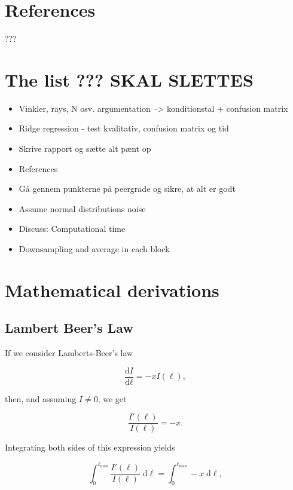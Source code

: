 \documentclass{article}
\newcommand{\diff}[2]{\frac{\text{d} #1}{\text{d} #2}}
\begin{document}
\section{References}
???


\section{The list ??? SKAL SLETTES}
\begin{itemize}
    \item Vinkler, rays, N osv. argumentation --> konditionstal + confusion matrix
    \item Ridge regression - test kvalitativ, confusion matrix og tid
    \item Skrive rapport og sætte alt pænt op
    \item References
    \item Gå gennem punkterne på peergrade og sikre, at alt er godt
    \item Assume normal distributions noise
    \item Discuss: Computational time 
    \item Downsampling and average in each block
\end{itemize}





\newpage
\appendix
\section{Mathematical derivations}
\subsection{Lambert Beer's Law}\label{appendix:lambert-beers-law}
If we consider Lamberts-Beer's law

\begin{equation}\label{eq:lamberts-beer}
    \diff{I}{\ell} = -x I(\ell),
\end{equation}

then, and assuming $I \neq 0$, we get

\begin{equation}
    \frac{I'(\ell)}{I(\ell)} = -x.
\end{equation}

Integrating both sides of this expression yields

\begin{equation}
    \int_{0}^{\ell_{\max}} \frac{I'(\ell)}{I(\ell)} \; \mathrm{d}\ell = \int_{0}^{\ell_{\max}} -x \; \mathrm{d}\ell,
\end{equation}
\end{document}
